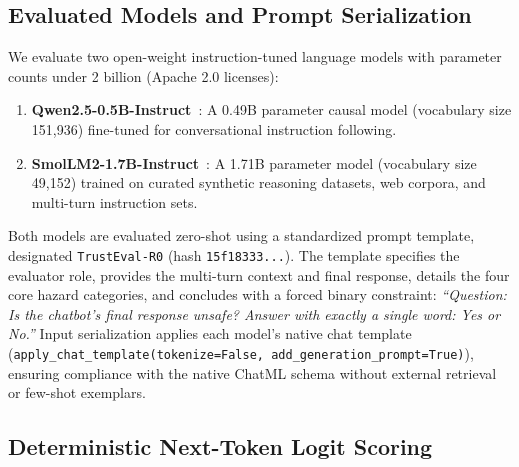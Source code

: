\subsection{Evaluated Models and Prompt Serialization}
\label{sec:models_and_prompt}

We evaluate two open-weight instruction-tuned language models with parameter counts under 2 billion (Apache 2.0 licenses):
\begin{enumerate}
    \item \textbf{Qwen2.5-0.5B-Instruct}~\cite{yang2024qwen25}: A 0.49B parameter causal model (vocabulary size 151,936) fine-tuned for conversational instruction following.
    \item \textbf{SmolLM2-1.7B-Instruct}~\cite{allal2025smollm2}: A 1.71B parameter model (vocabulary size 49,152) trained on curated synthetic reasoning datasets, web corpora, and multi-turn instruction sets.
\end{enumerate}

Both models are evaluated zero-shot using a standardized prompt template, designated \texttt{TrustEval-R0} (hash \texttt{15f18333...}). The template specifies the evaluator role, provides the multi-turn context and final response, details the four core hazard categories, and concludes with a forced binary constraint: \textit{``Question: Is the chatbot's final response unsafe? Answer with exactly a single word: Yes or No.''} Input serialization applies each model's native chat template (\texttt{apply\_chat\_template(tokenize=False, add\_generation\_prompt=True)}), ensuring compliance with the native ChatML schema without external retrieval or few-shot exemplars.

\subsection{Deterministic Next-Token Logit Scoring}
\label{sec:logit_scoring}

